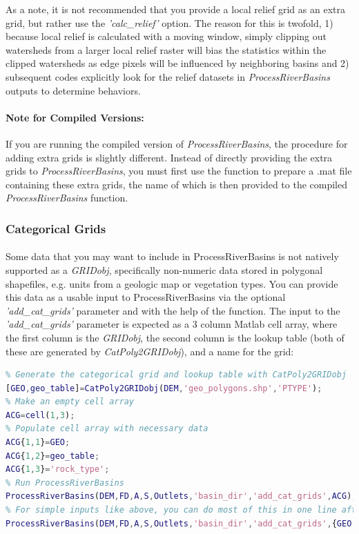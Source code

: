 \noindent
As a note, it is not recommended that you provide a local relief grid as an extra grid, but rather use the \textit{'calc\_relief'} option. The reason for this is twofold, 1) because local relief is calculated with a moving window, simply clipping out watersheds from a larger local relief raster will bias the statistics within the clipped watersheds as edge pixels will be influenced by neighboring basins and 2) subsequent codes explicitly look for the relief datasets in \textit{ProcessRiverBasins} outputs to determine behaviors. 

\paragraph{Note for Compiled Versions:} If you are running the compiled version of \textit{ProcessRiverBasins}, the procedure for adding extra grids is slightly different. Instead of directly providing the extra grids to \textit{ProcessRiverBasins}, you must first use the  function to prepare a .mat file containing these extra grids, the name of which is then provided to the compiled \textit{ProcessRiverBasins} function.

\subsubsection{Categorical Grids} \label{sec:PRB_ACG}
\paragraph{}Some data that you may want to include in ProcessRiverBasins is not natively supported as a \textit{GRIDobj}, specifically non-numeric data stored in polygonal shapefiles, e.g. units from a geologic map or vegetation types. You can provide this data as a usable input to ProcessRiverBasins via the optional \textit{'add\_cat\_grids'} parameter and with the help of the  function. The input to the \textit{'add\_cat\_grids'} parameter is expected as a 3 column Matlab cell array, where the first column is the \textit{GRIDobj}, the second column is the lookup table (both of these are generated by \textit{CatPoly2GRIDobj}), and a name for the grid:

\begin{lstlisting}[language=Matlab]
% To run ProcessRiverBasins an additional categorical grid
% Generate the categorical grid and lookup table with CatPoly2GRIDobj
[GEO,geo_table]=CatPoly2GRIDobj(DEM,'geo_polygons.shp','PTYPE');
% Make an empty cell array
ACG=cell(1,3);
% Populate cell array with necessary data
ACG{1,1}=GEO;
ACG{1,2}=geo_table;
ACG{1,3}='rock_type';
% Run ProcessRiverBasins
ProcessRiverBasins(DEM,FD,A,S,Outlets,'basin_dir','add_cat_grids',ACG);
% For simple inputs like above, you can do most of this in one line after generating GEO and geo_table with CatPoly2GRIDobj
ProcessRiverBasins(DEM,FD,A,S,Outlets,'basin_dir','add_cat_grids',{GEO geo_table 'geology'});
\end{lstlisting}

